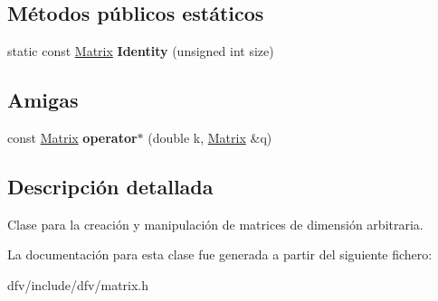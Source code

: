 \subsection*{\-Métodos públicos estáticos}
\begin{DoxyCompactItemize}
\item 
\hypertarget{classdfv_1_1Matrix_a36185fb596e40320f3a3755e11ebf992}{static const \hyperlink{classdfv_1_1Matrix}{\-Matrix} {\bfseries \-Identity} (unsigned int size)}\label{classdfv_1_1Matrix_a36185fb596e40320f3a3755e11ebf992}

\end{DoxyCompactItemize}
\subsection*{\-Amigas}
\begin{DoxyCompactItemize}
\item 
\hypertarget{classdfv_1_1Matrix_a7a2b6c71251efd460f3eafd44f7d497b}{const \hyperlink{classdfv_1_1Matrix}{\-Matrix} {\bfseries operator$\ast$} (double k, \hyperlink{classdfv_1_1Matrix}{\-Matrix} \&q)}\label{classdfv_1_1Matrix_a7a2b6c71251efd460f3eafd44f7d497b}

\end{DoxyCompactItemize}


\subsection{\-Descripción detallada}
\-Clase para la creación y manipulación de matrices de dimensión arbitraria. 

\-La documentación para esta clase fue generada a partir del siguiente fichero\-:\begin{DoxyCompactItemize}
\item 
dfv/include/dfv/matrix.\-h\end{DoxyCompactItemize}
